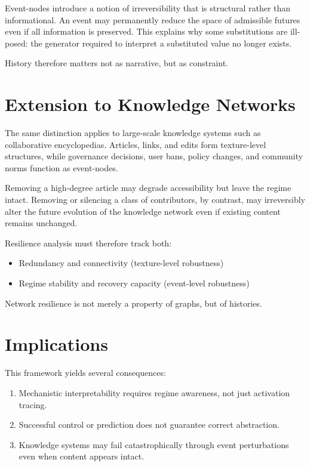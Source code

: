 \documentclass[11pt]{article}
\begin{document}
Event-nodes introduce a notion of irreversibility that is structural rather than informational. An event may permanently reduce the space of admissible futures even if all information is preserved. This explains why some substitutions are ill-posed: the generator required to interpret a substituted value no longer exists.

History therefore matters not as narrative, but as constraint.

\section{Extension to Knowledge Networks}

The same distinction applies to large-scale knowledge systems such as collaborative encyclopedias. Articles, links, and edits form texture-level structures, while governance decisions, user bans, policy changes, and community norms function as event-nodes.

Removing a high-degree article may degrade accessibility but leave the regime intact. Removing or silencing a class of contributors, by contrast, may irreversibly alter the future evolution of the knowledge network even if existing content remains unchanged.

Resilience analysis must therefore track both:
\begin{itemize}
\item Redundancy and connectivity (texture-level robustness)
\item Regime stability and recovery capacity (event-level robustness)
\end{itemize}

Network resilience is not merely a property of graphs, but of histories.

\section{Implications}

This framework yields several consequences:

\begin{enumerate}
\item Mechanistic interpretability requires regime awareness, not just activation tracing.
\item Successful control or prediction does not guarantee correct abstraction.
\item Knowledge systems may fail catastrophically through event perturbations even when content appears intact.
\end{enumerate}
\end{document}
